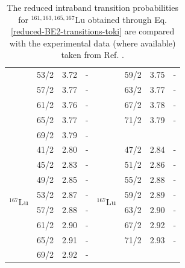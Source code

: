 \begin{table}
\begin{tabular}{|c|c|c|c|c|ccc|}
    & 53/2 & 3.72 & - &  & \multicolumn{1}{c|}{59/2} & \multicolumn{1}{c|}{3.75} & - \\ \cline{2-4} \cline{6-8} 
    & 57/2 & 3.77 & - &  & \multicolumn{1}{c|}{63/2} & \multicolumn{1}{c|}{3.77} & - \\ \cline{2-4} \cline{6-8} 
    & 61/2 & 3.76 & - &  & \multicolumn{1}{c|}{67/2} & \multicolumn{1}{c|}{3.78} & - \\ \cline{2-4} \cline{6-8} 
    & 65/2 & 3.77 & - &  & \multicolumn{1}{c|}{71/2} & \multicolumn{1}{c|}{3.79} & - \\ \cline{2-4} \cline{6-8} 
    & 69/2 & 3.79 & - &  & \multicolumn{3}{c|}{}                                     \\ \hline
    \multirow{8}{*}{$^{167}$Lu} & 41/2 & 2.80 & - & \multirow{8}{*}{$^{167}$Lu} & \multicolumn{1}{c|}{47/2} & \multicolumn{1}{c|}{2.84} & - \\ \cline{2-4} \cline{6-8} 
    & 45/2 & 2.83 & - &  & \multicolumn{1}{c|}{51/2} & \multicolumn{1}{c|}{2.86} & - \\ \cline{2-4} \cline{6-8} 
    & 49/2 & 2.85 & - &  & \multicolumn{1}{c|}{55/2} & \multicolumn{1}{c|}{2.88} & - \\ \cline{2-4} \cline{6-8} 
    & 53/2 & 2.87 & - &  & \multicolumn{1}{c|}{59/2} & \multicolumn{1}{c|}{2.89} & - \\ \cline{2-4} \cline{6-8} 
    & 57/2 & 2.88 & - &  & \multicolumn{1}{c|}{63/2} & \multicolumn{1}{c|}{2.90} & - \\ \cline{2-4} \cline{6-8} 
    & 61/2 & 2.90 & - &  & \multicolumn{1}{c|}{67/2} & \multicolumn{1}{c|}{2.92} & - \\ \cline{2-4} \cline{6-8} 
    & 65/2 & 2.91 & - &  & \multicolumn{1}{c|}{71/2} & \multicolumn{1}{c|}{2.93} & - \\ \cline{2-4} \cline{6-8} 
    & 69/2 & 2.92 & - &  & \multicolumn{3}{c|}{}                                     \\ \hline
    \end{tabular}
    \caption{The reduced intraband transition probabilities for $^{161,163,165,167}$Lu obtained through Eq. \ref{reduced-BE2-transitions-toki} are compared with the experimental data (where available) taken from Ref. \cite{reich2010nuclear}.}
    \label{table-intraband-E2-numerical-results}
\end{table}
